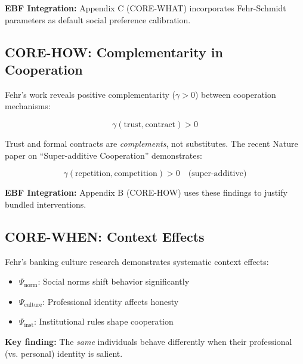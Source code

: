 \textbf{EBF Integration:} Appendix C (CORE-WHAT) incorporates Fehr-Schmidt
parameters as default social preference calibration.

\subsection{CORE-HOW: Complementarity in Cooperation}

Fehr's work reveals positive complementarity ($\gamma > 0$) between cooperation
mechanisms:

\begin{equation}
\gamma(\text{trust}, \text{contract}) > 0
\end{equation}

Trust and formal contracts are \textit{complements}, not substitutes. The
recent Nature paper on ``Super-additive Cooperation'' \citep{efferson2024superadditive}
demonstrates:

\begin{equation}
\gamma(\text{repetition}, \text{competition}) > 0 \quad \text{(super-additive)}
\end{equation}

\textbf{EBF Integration:} Appendix B (CORE-HOW) uses these findings to justify
bundled interventions.

\subsection{CORE-WHEN: Context Effects}

Fehr's banking culture research \citep{cohn2014business, cohn2015evidence}
demonstrates systematic context effects:

\begin{itemize}[nosep]
    \item $\Psi_{\text{norm}}$: Social norms shift behavior significantly
    \item $\Psi_{\text{culture}}$: Professional identity affects honesty
    \item $\Psi_{\text{inst}}$: Institutional rules shape cooperation
\end{itemize}

\textbf{Key finding:} The \textit{same} individuals behave differently when
their professional (vs. personal) identity is salient.

